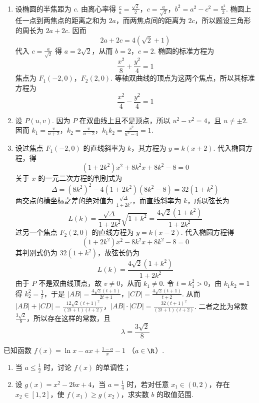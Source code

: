 \begin{solution}
\begin{enumerate}
\item 设椭圆的半焦距为 \(c\). 由离心率得
\(\frac ca=\frac{\sqrt2}{2}\)，\(c=\frac{a}{\sqrt2}\)，\(b^2=a^2-c^2=\frac{a^2}{2}\).
椭圆上任一点到两焦点的距离之和为 \(2a\)，而两焦点间的距离为 \(2c\)，所以题设三角形的周长为 \(2a+2c\). 因而
\[
2a+2c=4(\sqrt2+1)
\]
代入 \(c=\frac{a}{\sqrt2}\) 得 \(a=2\sqrt2\)，从而 \(b=2\)，\(c=2\). 椭圆的标准方程为
\[
\frac{x^2}{8}+\frac{y^2}{4}=1
\]
焦点为 \(F_1(-2,0)\)，\(F_2(2,0)\). 等轴双曲线的顶点为这两个焦点，所以其标准方程为
\[
\frac{x^2}{4}-\frac{y^2}{4}=1
\]
\item 设 \(P(u,v)\). 因为 \(P\) 在双曲线上且不是顶点，所以 \(u^2-v^2=4\)，且 \(u\ne\pm2\). 因而
\(k_1=\frac{v}{u+2}\)，\(k_2=\frac{v}{u-2}\)，\(k_1k_2=\frac{v^2}{u^2-4}=1\).
\item 设过焦点 \(F_1(-2,0)\) 的直线斜率为 \(k\)，其方程为 \(y=k(x+2)\). 代入椭圆方程，得
\[
(1+2k^2)x^2+8k^2x+8k^2-8=0
\]
关于 \(x\) 的一元二次方程的判别式为
\[
\Delta=(8k^2)^2-4(1+2k^2)(8k^2-8)=32(1+k^2)
\]
两交点的横坐标之差的绝对值为 \(\frac{\sqrt\Delta}{1+2k^2}\)，而直线斜率为 \(k\)，所以弦长为
\[
L(k)=\frac{\sqrt\Delta}{1+2k^2}\sqrt{1+k^2}=\frac{4\sqrt2(1+k^2)}{1+2k^2}
\]
过另一个焦点 \(F_2(2,0)\) 的直线方程为 \(y=k(x-2)\). 代入椭圆方程得
\[
(1+2k^2)x^2-8k^2x+8k^2-8=0
\]
其判别式仍为 \(32(1+k^2)\)，故弦长仍为
\[
L(k)=\frac{4\sqrt2(1+k^2)}{1+2k^2}
\]
由于 \(P\) 不是双曲线顶点，故 \(v\ne0\)，从而 \(k_1\ne0\). 令 \(t=k_1^2>0\)，由 \(k_1k_2=1\) 得 \(k_2^2=\frac1t\)，于是
\(|AB|=\frac{4\sqrt2(t+1)}{2t+1}\)，\(|CD|=\frac{4\sqrt2(t+1)}{t+2}\).
从而
\(|AB|+|CD|=\frac{12\sqrt2(t+1)^2}{(2t+1)(t+2)}\)，\(|AB|\cdot|CD|=\frac{32(t+1)^2}{(2t+1)(t+2)}\).
二者之比为常数 \(\frac{3\sqrt2}{8}\)，所以存在这样的常数，且
\[
\lambda=\frac{3\sqrt2}{8}
\]
\end{enumerate}
\end{solution}

\begin{problem}
已知函数 \( f(x) = \ln x - ax + \frac{1 - a}{x} - 1 \) （\(a \in \R\)）.
\begin{enumerate}
\item 当 \(a \leqslant \frac{1}{2}\) 时，讨论 \(f(x)\) 的单调性；
\item 设 \( g(x) = x^{2} - 2bx + 4 \)，当 \(a = \frac{1}{4}\) 时，若对任意 \(x_1 \in (0, 2)\)，存在 \(x_2 \in [1, 2]\)，使 \(f(x_1) \geqslant g(x_2)\)，求实数 \(b\) 的取值范围.
\end{enumerate}
\end{problem}

